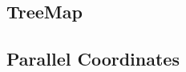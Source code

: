 \documentclass[12pt]{article}
\begin{document}
\begin{doublespace}
\subsection{TreeMap}
\subsection{Parallel Coordinates}


%
%
%
%
%
%

\end{doublespace}
\end{document}
